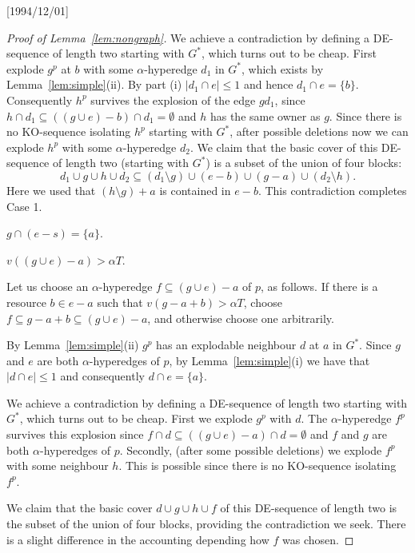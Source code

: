 \NeedsTeXFormat{LaTeX2e}[1994/12/01]\documentclass[letterpaper, 11pt]{article}
\theoremstyle{definition}
\theoremstyle{remark}
\numberwithin{equation}{section}
\begin{document}
\begin{proof}[Proof of Lemma~\ref{lem:nongraph}]
We achieve a contradiction by defining a DE-sequence of length two
starting with $G^*$, which turns out to be cheap.
First explode $g^p$ at $b$ with some $\alpha$-hyperedge $d_1$ in $G^*$, which
exists by Lemma~\ref{lem:simple}(ii). By part (i) $|d_1 \cap e| \leq
1$ and hence $d_1 \cap e = \{ b \}$.
Consequently $h^p$ survives the explosion of the edge $gd_1$, since
$h\cap d_1 \subseteq ((g\cup e) -b) \cap d_1= \emptyset$ and $h$ has
the same owner as $g$.
Since there is no KO-sequence isolating $h^p$ starting with $G^*$,
after possible deletions now
we can explode $h^p$ with some $\alpha$-hyperedge $d_2$.
We claim that the basic cover of
this  DE-sequence of length two (starting with $G^*$) is a subset of the union of four blocks: 
$$d_1 \cup g \cup h \cup d_2 \subseteq (d_1\setminus g) \cup (e- b) \cup (g-a)
\cup (d_2\setminus h).$$
Here we used that $(h\setminus g) + a$ is contained in $e-b$. 
This contradiction completes Case 1.

\medskip

 $g \cap (e- s) = \{ a \}$.

\medskip

 $v((g\cup e)-a) >\alpha T$.

Let us choose an $\alpha$-hyperedge
$f\subseteq(g\cup e)-a$ of $p$, as follows. If there is a resource $b\in e-a$ such that
$v(g-a+b)>\alpha T$, choose $f\subseteq g-a+b \subseteq (g\cup e)-a$, and
otherwise choose one arbitrarily.

By Lemma~\ref{lem:simple}(ii) $g^p$ has
an explodable neighbour $d$ at $a$ in $G^*$. 
Since $g$ and $e$ are both $\alpha$-hyperedges of $p$,
by Lemma~\ref{lem:simple}(i) we have that 
$|d\cap e| \leq 1$ and consequently $d\cap e = \{ a \}$. 

We achieve a contradiction by defining a DE-sequence of length two
starting with $G^*$,
which turns out to be cheap. First we explode $g^p$ with $d$.
The $\alpha$-hyperedge
$f^p$ survives this explosion since $f\cap d \subseteq ((g\cup e)
-a) \cap d =\emptyset$ and $f$ and $g$ are both
$\alpha$-hyperedges of $p$.
Secondly, (after some possible deletions) we explode $f^p$ with some
neighbour $h$. This is possible since there is no KO-sequence
isolating $f^p$.

We claim that the basic cover $d\cup g \cup h \cup f$
of this DE-sequence of length two is the subset of 
the union of four blocks, providing the contradiction we seek.
There is a slight difference in the accounting depending how $f$ was chosen.


\end{proof}
\end{document}
